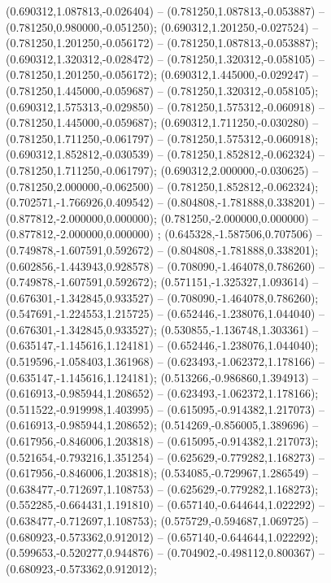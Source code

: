  (0.690312,1.087813,-0.026404) -- (0.781250,1.087813,-0.053887) -- (0.781250,0.980000,-0.051250);
 (0.690312,1.201250,-0.027524) -- (0.781250,1.201250,-0.056172) -- (0.781250,1.087813,-0.053887);
 (0.690312,1.320312,-0.028472) -- (0.781250,1.320312,-0.058105) -- (0.781250,1.201250,-0.056172);
 (0.690312,1.445000,-0.029247) -- (0.781250,1.445000,-0.059687) -- (0.781250,1.320312,-0.058105);
 (0.690312,1.575313,-0.029850) -- (0.781250,1.575312,-0.060918) -- (0.781250,1.445000,-0.059687);
 (0.690312,1.711250,-0.030280) -- (0.781250,1.711250,-0.061797) -- (0.781250,1.575312,-0.060918);
 (0.690312,1.852812,-0.030539) -- (0.781250,1.852812,-0.062324) -- (0.781250,1.711250,-0.061797);
 (0.690312,2.000000,-0.030625) -- (0.781250,2.000000,-0.062500) -- (0.781250,1.852812,-0.062324);
 (0.702571,-1.766926,0.409542) -- (0.804808,-1.781888,0.338201) -- (0.877812,-2.000000,0.000000);
 (0.781250,-2.000000,0.000000) -- (0.877812,-2.000000,0.000000) ;
 (0.645328,-1.587506,0.707506) -- (0.749878,-1.607591,0.592672) -- (0.804808,-1.781888,0.338201);
 (0.602856,-1.443943,0.928578) -- (0.708090,-1.464078,0.786260) -- (0.749878,-1.607591,0.592672);
 (0.571151,-1.325327,1.093614) -- (0.676301,-1.342845,0.933527) -- (0.708090,-1.464078,0.786260);
 (0.547691,-1.224553,1.215725) -- (0.652446,-1.238076,1.044040) -- (0.676301,-1.342845,0.933527);
 (0.530855,-1.136748,1.303361) -- (0.635147,-1.145616,1.124181) -- (0.652446,-1.238076,1.044040);
 (0.519596,-1.058403,1.361968) -- (0.623493,-1.062372,1.178166) -- (0.635147,-1.145616,1.124181);
 (0.513266,-0.986860,1.394913) -- (0.616913,-0.985944,1.208652) -- (0.623493,-1.062372,1.178166);
 (0.511522,-0.919998,1.403995) -- (0.615095,-0.914382,1.217073) -- (0.616913,-0.985944,1.208652);
 (0.514269,-0.856005,1.389696) -- (0.617956,-0.846006,1.203818) -- (0.615095,-0.914382,1.217073);
 (0.521654,-0.793216,1.351254) -- (0.625629,-0.779282,1.168273) -- (0.617956,-0.846006,1.203818);
 (0.534085,-0.729967,1.286549) -- (0.638477,-0.712697,1.108753) -- (0.625629,-0.779282,1.168273);
 (0.552285,-0.664431,1.191810) -- (0.657140,-0.644644,1.022292) -- (0.638477,-0.712697,1.108753);
 (0.575729,-0.594687,1.069725) -- (0.680923,-0.573362,0.912012) -- (0.657140,-0.644644,1.022292);
 (0.599653,-0.520277,0.944876) -- (0.704902,-0.498112,0.800367) -- (0.680923,-0.573362,0.912012);
